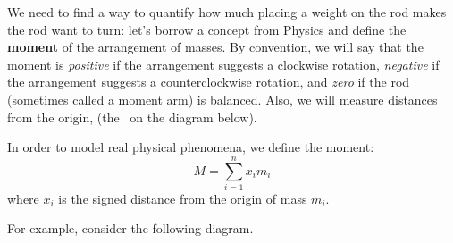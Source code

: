 
We need to find a way to quantify how much placing a weight on the rod makes the rod want to turn: let's borrow a concept from Physics and define the \textbf{moment} of the arrangement of masses. By convention, we will say that the moment is \textit{positive} if the arrangement suggests a clockwise rotation, \textit{negative} if the arrangement suggests a counterclockwise rotation, and \textit{zero} if the rod (sometimes called a moment arm) is balanced. Also, we will measure distances from the origin, (the \textbullet \ on the diagram below).

In order to model real physical phenomena, we define the moment:
$$
M=\sum_{i=1}^nx_im_i
$$
where $x_i$ is the signed distance from the origin of mass $m_i$.

For example, consider the following diagram.

\vspace{0.5cm}

